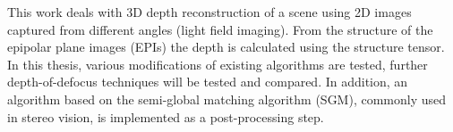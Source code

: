 This work deals with 3D depth reconstruction of a scene using 2D images captured from different angles (light field imaging). From the structure of the epipolar plane images (EPIs) the depth is calculated using the structure tensor. In this thesis, various modifications of existing algorithms are tested, further depth-of-defocus techniques will be tested and compared. In addition, an algorithm based on the semi-global matching algorithm (SGM), commonly used in stereo vision, is implemented as a post-processing step.